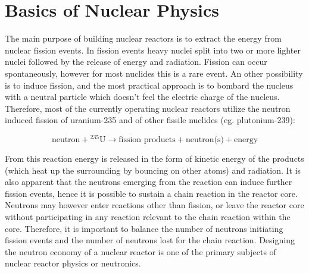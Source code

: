 % 
%
% 
%
%
%
%
%

\section{Basics of Nuclear Physics}

The main purpose of building nuclear reactors is to extract the energy from nuclear fission events. In fission events heavy nuclei split into two or more lighter nuclei followed by the release of energy and radiation. Fission can occur spontaneously, however for most nuclides this is a rare event. An other possibility is to induce fission, and the most practical approach is to bombard the nucleus with a neutral particle which doesn't feel the electric charge of the nucleus. Therefore, most of the currently operating nuclear reactors utilize the neutron induced fission of uranium-235 and of other fissile nuclides (eg. plutonium-239):

\[
\text{neutron}+{}^{235}\text{U} \rightarrow \text{fission products} + \text{neutron(s)} + \text{energy}
\]

From this reaction energy is released in the form of kinetic energy of the products (which heat up the surrounding by bouncing on other atoms) and radiation. It is also apparent that the neutrons emerging from the reaction can induce further fission events, hence it is possible to sustain a chain reaction in the reactor core. Neutrons may however enter reactions other than fission, or leave the reactor core without participating in any reaction relevant to the chain reaction within the core. Therefore, it is important to balance the number of neutrons initiating fission events and the number of neutrons lost for the chain reaction. Designing the neutron economy of a nuclear reactor is one of the primary subjects of nuclear reactor physics or neutronics. 

